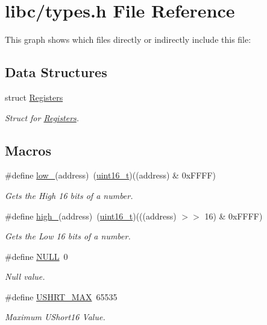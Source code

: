 \hypertarget{a00125}{}\section{libc/types.h File Reference}
\label{a00125}
This graph shows which files directly or indirectly include this file\+:
\subsection*{Data Structures}
\begin{DoxyCompactItemize}
\item 
struct \hyperlink{a00234}{Registers}
\begin{DoxyCompactList}\small\item\em Struct for \hyperlink{a00234}{Registers}. \end{DoxyCompactList}\end{DoxyCompactItemize}
\subsection*{Macros}
\begin{DoxyCompactItemize}
\item 
\#define \hyperlink{a00125_aded7ad58a4bedfffea10d5ae9c0c817e_aded7ad58a4bedfffea10d5ae9c0c817e}{low\+\_}(address)~(\hyperlink{a00125_a273cf69d639a59973b6019625df33e30_a273cf69d639a59973b6019625df33e30}{uint16\+\_\+t})((address) \& 0x\+F\+F\+F\+F)
\begin{DoxyCompactList}\small\item\em Gets the High 16 bits of a number. \end{DoxyCompactList}\item 
\#define \hyperlink{a00125_a0a63db19c3e2153ed419aeccf4e33c92_a0a63db19c3e2153ed419aeccf4e33c92}{high\+\_}(address)~(\hyperlink{a00125_a273cf69d639a59973b6019625df33e30_a273cf69d639a59973b6019625df33e30}{uint16\+\_\+t})(((address) $>$$>$ 16) \& 0x\+F\+F\+F\+F)
\begin{DoxyCompactList}\small\item\em Gets the Low 16 bits of a number. \end{DoxyCompactList}\item 
\#define \hyperlink{a00125_a070d2ce7b6bb7e5c05602aa8c308d0c4_a070d2ce7b6bb7e5c05602aa8c308d0c4}{N\+U\+LL}~0
\begin{DoxyCompactList}\small\item\em Null value. \end{DoxyCompactList}\item 
\#define \hyperlink{a00125_a689b119da994dece91d44b5aeac643ed_a689b119da994dece91d44b5aeac643ed}{U\+S\+H\+R\+T\+\_\+\+M\+AX}~65535
\begin{DoxyCompactList}\small\item\em Maximum U\+Short16 Value. \end{DoxyCompactList}\end{DoxyCompactItemize}
